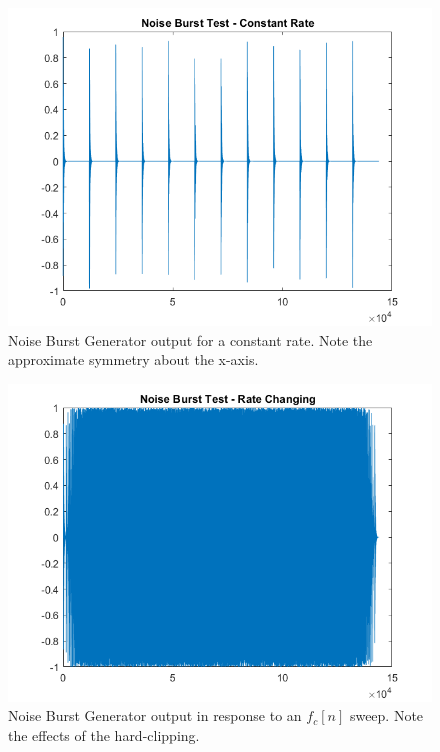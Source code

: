 \documentclass[../main.tex]{subfiles}
\begin{document}
\begin{figure}[h]
    \centering
    \includegraphics[scale=.65]{./images/plots/NBGTest1.png}
    \caption{Noise Burst Generator output for a constant rate. Note the approximate symmetry about the x-axis.}
    \label{fig:NBGT1}
\end{figure}

\begin{figure}[h]
    \centering
    \includegraphics[scale=.65]{./images/plots/NBGTest2.png}
    \caption{Noise Burst Generator output in response to an $f_c[n]$ sweep. Note the effects of the hard-clipping.}
    \label{fig:NBGT2}
\end{figure}
\end{document}
